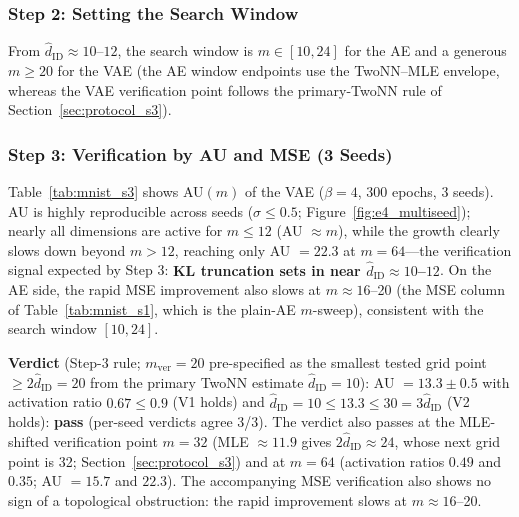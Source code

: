 \documentclass[make,article,submit,pdftex,moreauthors]{Definitions/mdpi}
\newcommand{\hatdID}{\hat{d}_{\mathrm{ID}}}
\begin{document}
\subsubsection{Step 2: Setting the Search Window}

From $\hatdID \approx 10$--$12$, the search window is $m \in [10, 24]$
for the AE and a generous $m \geq 20$ for the VAE
(the AE window endpoints use the TwoNN--MLE envelope, whereas the VAE
verification point follows the primary-TwoNN rule of
Section~\ref{sec:protocol_s3}).

\subsubsection{Step 3: Verification by AU and MSE (3 Seeds)}

Table~\ref{tab:mnist_s3} shows AU$(m)$ of the VAE ($\beta = 4$, 300 epochs,
3 seeds).
AU is highly reproducible across seeds
($\sigma \leq 0.5$; Figure~\ref{fig:e4_multiseed}); nearly all
dimensions are active for $m \leq 12$ (AU $\approx m$), while the growth
clearly slows down beyond $m > 12$, reaching only AU $= 22.3$ at
$m = 64$---the verification signal expected by Step 3:
\textbf{KL truncation sets in near $\hatdID \approx 10$--$12$}.
On the AE side, the rapid MSE improvement also slows at
$m \approx 16$--20 (the MSE column of Table~\ref{tab:mnist_s1}, which is the
plain-AE $m$-sweep), consistent with the search window $[10, 24]$.

\textbf{Verdict} (Step-3 rule; $m_{\mathrm{ver}} = 20$ pre-specified as
the smallest tested grid point $\geq 2\hatdID = 20$ from the primary TwoNN
estimate $\hatdID = 10$): AU $= 13.3 \pm 0.5$ with
activation ratio $0.67 \leq 0.9$ (V1 holds) and
$\hatdID = 10 \leq 13.3 \leq 30 = 3\hatdID$ (V2 holds): \textbf{pass}
(per-seed verdicts agree 3/3).
The verdict also passes at the MLE-shifted verification point $m = 32$
(MLE $\approx 11.9$ gives $2\hatdID \approx 24$, whose next grid point is
32; Section~\ref{sec:protocol_s3}) and at $m = 64$
(activation ratios $0.49$ and $0.35$; AU $= 15.7$ and $22.3$).
The accompanying MSE verification also shows no sign of a topological
obstruction: the rapid improvement slows at $m \approx 16$--20.
\end{document}

